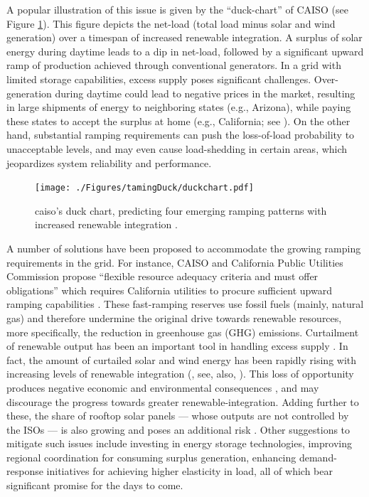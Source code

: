 A popular illustration of this issue is given by the ``duck-chart'' of CAISO (see Figure \ref{ch:td:fig:duckchart}). This figure depicts the net-load (total load minus solar and wind generation) over a timespan of increased renewable integration. A surplus of solar energy during daytime leads to a dip in net-load, followed by a significant upward ramp of production achieved through conventional generators. In a grid with limited storage capabilities, excess supply poses significant challenges. Over-generation during daytime could lead to negative prices in the market, resulting in large shipments of energy to neighboring states (e.g., Arizona), while paying these states to accept the surplus at home (e.g., California; see \citealp{Penn2017}). On the other hand, substantial ramping requirements can push the loss-of-load probability to unacceptable levels, and may even cause load-shedding in certain areas, which jeopardizes system reliability and performance. 

\begin{figure}[h]
\centering
\texttt{[image: ./Figures/tamingDuck/duckchart.pdf]}
\caption{\gls{caiso}'s duck chart, predicting four emerging ramping patterns with increased renewable integration \citep{caiso2016}.}
\label{ch:td:fig:duckchart}
\end{figure}

A number of solutions have been proposed to accommodate the growing ramping requirements in the grid. For instance, CAISO and California Public Utilities Commission propose ``flexible resource adequacy criteria and must offer obligations'' which requires California utilities to procure sufficient upward ramping capabilities \citep{FracMoo16}. These fast-ramping reserves use fossil fuels (mainly, natural gas) and therefore undermine the original drive towards renewable resources, more specifically, the reduction in greenhouse gas (GHG) emissions. Curtailment of renewable output has been an important tool in handling excess supply \citep{Olson2015}. In fact, the amount of curtailed solar and wind energy has been rapidly rising with increasing levels of renewable integration (\citealp{caisoOverSupply}, see, also, \citealp{Penn2017}). This loss of opportunity produces negative economic and environmental consequences \citep{caiso2017}, and may discourage the progress towards greater renewable-integration. Adding further to these, the share of rooftop solar panels --- whose outputs are not controlled by the ISOs --- is also growing and poses an additional risk \citep{Penn2017}. Other suggestions to mitigate such issues include investing in energy storage technologies, improving regional coordination for consuming surplus generation, enhancing demand-response initiatives for achieving higher elasticity in load, all of which bear significant promise for the days to come.


